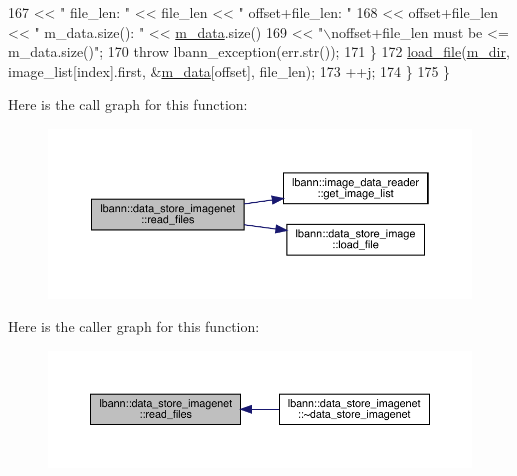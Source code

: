 \begin{DoxyCode}
167         << \textcolor{stringliteral}{" file\_len: "} << file\_len << \textcolor{stringliteral}{" offset+file\_len: "}
168         << offset+file\_len << \textcolor{stringliteral}{" m\_data.size(): "} << \hyperlink{classlbann_1_1data__store__image_a10e9aa0c240785bc0a961f24e87a1c16}{m\_data}.size()
169         << \textcolor{stringliteral}{"\(\backslash\)noffset+file\_len must be <= m\_data.size()"};
170       \textcolor{keywordflow}{throw} lbann\_exception(err.str());
171     \}
172     \hyperlink{classlbann_1_1data__store__image_a8a53bab58d75554821f90c38d14078aa}{load\_file}(\hyperlink{classlbann_1_1generic__data__store_ab479c127f00ce550c7433b90e40a5a3d}{m\_dir}, image\_list[index].first, &\hyperlink{classlbann_1_1data__store__image_a10e9aa0c240785bc0a961f24e87a1c16}{m\_data}[offset], file\_len);
173     ++j;
174   \}
175 \}
\end{DoxyCode}
Here is the call graph for this function\+:\nopagebreak
\begin{figure}[H]
\begin{center}
\leavevmode
\includegraphics[width=350pt]{classlbann_1_1data__store__imagenet_a70cfd8f529aad8d66993000da7350ec5_cgraph}
\end{center}
\end{figure}
Here is the caller graph for this function\+:\nopagebreak
\begin{figure}[H]
\begin{center}
\leavevmode
\includegraphics[width=350pt]{classlbann_1_1data__store__imagenet_a70cfd8f529aad8d66993000da7350ec5_icgraph}
\end{center}
\end{figure}
\mbox{\label{classlbann_1_1data__store__imagenet_a611aa1734a491c443396a077b49fe4fe}} 
